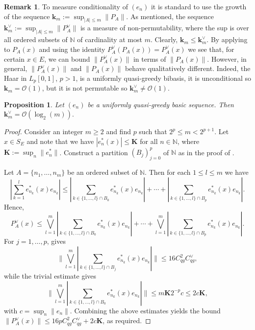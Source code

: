 \documentclass[12pt,leqno]{amsart}
\newtheorem{proposition}[theorem]{Proposition}
\numberwithin{equation}{section}
\theoremstyle{definition}
\newtheorem{remark}[theorem]{Remark}
\def\N{{\mathbb N}}
\begin{document}
\begin{remark}
To measure conditionality of $(e_n)$ it is standard to use the growth of the sequence $\textbf{k}_m:=\sup_{|A|\leq m}\|P_A\|$. As mentioned, the sequence $\textbf{k}_m^\vee:=\sup_{|A|\leq m}\|P_A^\vee\|$ is a measure of non-permutability, where the sup is over all ordered subsets of $\N$ of cardinality at most $m$.  Clearly, $\textbf{k}_m\leq \textbf{k}_m^\vee$.  By applying   to $P_A(x)$ and using  the identity $P_A^\vee(P_A(x))=P_A^\vee(x)$ we see that, for certain $x\in E$, we can bound $\|P_A^\vee(x)\|$ in terms of $\|P_A(x)\|$. However, in general, $\|P_A^\vee(x)\|$ and $\|P_A(x)\|$ behave qualitatively different. Indeed, the Haar in $L_p[0,1]$, $p>1$, is a uniformly quasi-greedy bibasis, it is unconditional so $\textbf{k}_m=\mathcal{O}(1)$, but it is not permutable so $\textbf{k}_m^\vee \neq \mathcal{O}(1)$. 
\end{remark}
\begin{proposition}\label{asymp bound of constant}
 Let  $(e_n)$ be a uniformly quasi-greedy basic sequence.  Then $\textbf{k}_m^\vee=\mathcal{O}(\log_2(m)).$
\end{proposition}
\begin{proof}
Consider an integer $m\geq 2$ and find $p$ such that $2^p\leq m<2^{p+1}$. Let $x\in S_E$ and note that we have $|e_n^*(x)|\leq \textbf{K}$ for all $n\in \N$, where $\textbf{K}:=\sup_n \|e_n^*\|$. Construct a partition $(B_j)_{j=0}^p$ of $\mathbb{N}$ as in the proof of \cite[Theorem 10.2.14]{AK16}.
\medskip

Let $A=\{n_1,\dots,n_m\}$ be an ordered subset of $\N$. Then for each $1\leq l\leq m$ we have 
$$\left|\sum_{k=1}^l e_{n_k}^*(x)e_{n_k}\right|\leq \left|\sum_{k\in\{1,\dots, l\}\cap B_0} e_{n_k}^*(x)e_{n_k}\right|+\cdots+ \left|\sum_{k\in\{1,\dots, l\}\cap B_p} e_{n_k}^*(x)e_{n_k}\right|.$$
Hence,
$$P_A^\vee(x)\leq \bigvee_{l=1}^m\left|\sum_{k\in\{1,\dots, l\}\cap B_0} e_{n_k}^*(x)e_{n_k}\right|+\cdots+ \bigvee_{l=1}^m\left|\sum_{k\in\{1,\dots, l\}\cap B_p} e_{n_k}^*(x)e_{n_k}\right|.$$
For $j=1,\dots, p$,  gives $$\bigg\|\bigvee_{l=1}^m\left|\sum_{k\in\{1,\dots, l\}\cap B_j} e_{n_k}^*(x)e_{n_k}\right|\bigg\|\leq 16 C_{qg}^2C_{qg}^\vee,$$ while the trivial estimate gives $$\bigg\|\bigvee_{l=1}^m\left|\sum_{k\in\{1,\dots, l\}\cap B_0} e_{n_k}^*(x)e_{n_k}\right|\bigg\|\leq m\textbf{K}2^{-p}c\leq 2c\textbf{K},$$
with $c=\sup_n \|e_n\|$. Combining the above estimates yields the bound $\|P_A^\vee(x)\|\leq 16pC_{qg}^2C_{qg}^\vee+2c\textbf{K}$, as required.
\end{proof}
\end{document}
